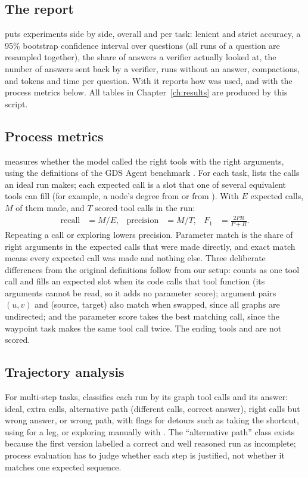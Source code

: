 \subsection{The report}

 puts experiments side by side, overall and per task: lenient and strict accuracy, a 95\%
bootstrap confidence interval over questions (all runs of a question are resampled together), the share of answers a
verifier actually looked at, the number of answers sent back by a verifier, runs without an answer, compactions, and
tokens and time per question. With  it reports how  was used, and with 
the process metrics below. All tables in Chapter~\ref{ch:results} are produced by this script.

\subsection{Process metrics}
\label{sec:process-metrics}

 measures whether the model called the right tools with the right arguments, using the
definitions of the GDS Agent benchmark \cite{gdsagentbench}. For each task,  lists the calls an
ideal run makes; each expected call is a slot that one of several equivalent tools can fill (for example, a node's
degree from  or from ). With $E$ expected calls, $M$ of them made, and $T$ scored tool
calls in the run:
\begin{align*}
  \text{recall} &= M / E, &
  \text{precision} &= M / T, &
  F_1 &= \frac{2PR}{P + R}.
\end{align*}
Repeating a call or exploring lowers precision. Parameter match is the share of right arguments in the expected calls
that were made directly, and exact match means every expected call was made and nothing else. Three deliberate
differences from the original definitions follow from our setup:  counts as one tool call and fills
an expected slot when its code calls that tool function (its arguments cannot be read, so it adds no parameter score);
argument pairs $(u, v)$ and (source, target) also match when swapped, since all graphs are undirected; and the
parameter score takes the best matching call, since the waypoint task makes the same tool call twice. The ending tools
and  are not scored.

\subsection{Trajectory analysis}

For multi-step tasks,  classifies each run by its graph tool calls and its answer:
ideal, extra calls, alternative path (different calls, correct answer), right calls but wrong answer, or wrong path,
with flags for detours such as taking the shortcut, using  for a leg, or exploring manually with
. The ``alternative path'' class exists because the first version labelled a correct and well
reasoned run as incomplete; process evaluation has to judge whether each step is justified, not whether it matches one
expected sequence.
